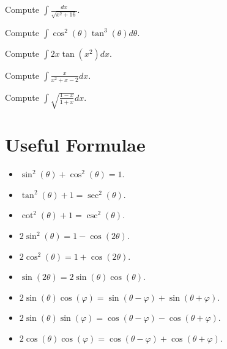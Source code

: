 \documentclass[12pt]{amsart}
\begin{document}
\newpage

\begin{thm}[20 Points]
  Compute $\displaystyle{\int\frac{dx}{\sqrt{x^2 + 16}}}$.
\end{thm}

\newpage

\begin{thm}[20 Points]
  Compute $\displaystyle{\int\cos^2(\theta)\tan^3(\theta)d\theta}$.
\end{thm}

\newpage

\begin{thm}[20 Points]
  Compute $\displaystyle{\int 2x\tan(x^2)dx}$.
\end{thm}

\newpage

\begin{thm}[20 Points]
  Compute $\displaystyle{\int\frac{x}{x^2 + x - 2}}dx$.
\end{thm}

\newpage

\begin{thm}
  Compute $\displaystyle{\int \sqrt{\frac{1-x}{1+x}}}dx$.
\end{thm}

\newpage
\section{Useful Formulae}

\begin{itemize}
\item
  $\sin^2(\theta) + \cos^2(\theta) = 1$.
\item
  $\tan^2(\theta) + 1 = \sec^2(\theta)$.
\item
  $\cot^2(\theta) + 1 = \csc^2(\theta)$.
\item
  $2\sin^2(\theta) = 1 - \cos(2\theta)$.
\item
  $2\cos^2(\theta) = 1 + \cos(2\theta)$.
\item
  $\sin(2\theta) = 2\sin(\theta)\cos(\theta)$.
\item
  $2\sin(\theta)\cos(\varphi) = \sin(\theta - \varphi) + \sin(\theta + \varphi)$.
\item
  $2\sin(\theta)\sin(\varphi) = \cos(\theta - \varphi) - \cos(\theta + \varphi)$.
\item
  $2\cos(\theta)\cos(\varphi) = \cos(\theta - \varphi) + \cos(\theta + \varphi)$.
\end{itemize}
\end{document}
